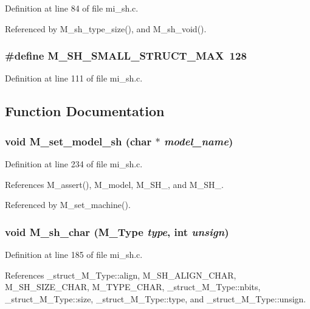 Definition at line 84 of file mi\_\-sh.c.

Referenced by M\_\-sh\_\-type\_\-size(), and M\_\-sh\_\-void().
\subsubsection{\setlength{\rightskip}{0pt plus 5cm}\#define M\_\-SH\_\-SMALL\_\-STRUCT\_\-MAX~128}\label{mi__sh_8c_17e9df7e1c9e4c8203862d06cb6c93fd}




Definition at line 111 of file mi\_\-sh.c.

\subsection{Function Documentation}
\subsubsection{\setlength{\rightskip}{0pt plus 5cm}void M\_\-set\_\-model\_\-sh (char $\ast$ {\em model\_\-name})}\label{mi__sh_8c_bc009df401271aab8227dfedb1dd0721}




Definition at line 234 of file mi\_\-sh.c.

References M\_\-assert(), M\_\-model, M\_\-SH\_, and M\_\-SH\_.

Referenced by M\_\-set\_\-machine().
\subsubsection{\setlength{\rightskip}{0pt plus 5cm}void M\_\-sh\_\-char (\bf{M\_\-Type} {\em type}, int {\em unsign})}\label{mi__sh_8c_f2ab2bcc98d514b1d8c249f3c1f3d235}




Definition at line 185 of file mi\_\-sh.c.

References \_\-struct\_\-M\_\-Type::align, M\_\-SH\_\-ALIGN\_\-CHAR, M\_\-SH\_\-SIZE\_\-CHAR, M\_\-TYPE\_\-CHAR, \_\-struct\_\-M\_\-Type::nbits, \_\-struct\_\-M\_\-Type::size, \_\-struct\_\-M\_\-Type::type, and \_\-struct\_\-M\_\-Type::unsign.

